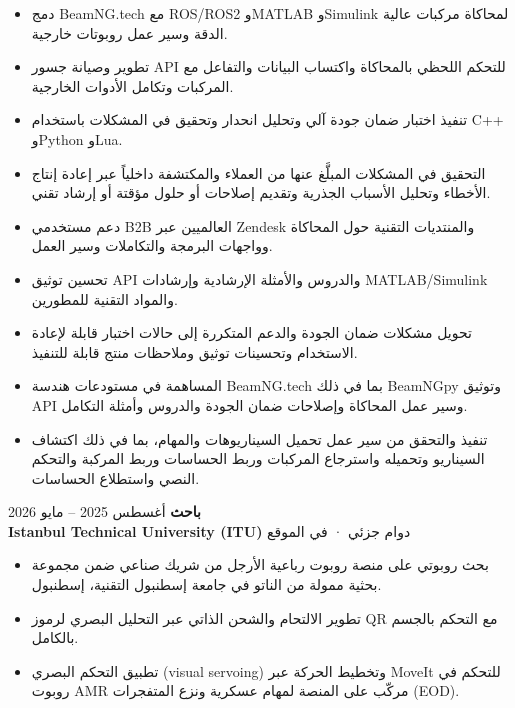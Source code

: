 \documentclass[11pt,a4paper]{article}
\newcommand{\en}[1]{\textenglish{#1}}
\begin{document}
\begin{itemize}
    \item دمج \en{BeamNG.tech} مع \en{ROS/ROS2} و\en{MATLAB} و\en{Simulink} لمحاكاة مركبات عالية الدقة وسير عمل روبوتات خارجية.
    \item تطوير وصيانة جسور \en{API} للتحكم اللحظي بالمحاكاة واكتساب البيانات والتفاعل مع المركبات وتكامل الأدوات الخارجية.
    \item تنفيذ اختبار ضمان جودة آلي وتحليل انحدار وتحقيق في المشكلات باستخدام \en{C++} و\en{Python} و\en{Lua}.
    \item التحقيق في المشكلات المبلَّغ عنها من العملاء والمكتشفة داخلياً عبر إعادة إنتاج الأخطاء وتحليل الأسباب الجذرية وتقديم إصلاحات أو حلول مؤقتة أو إرشاد تقني.
    \item دعم مستخدمي \en{B2B} العالميين عبر \en{Zendesk} والمنتديات التقنية حول المحاكاة وواجهات البرمجة والتكاملات وسير العمل.
    \item تحسين توثيق \en{API} والدروس والأمثلة الإرشادية وإرشادات \en{MATLAB/Simulink} والمواد التقنية للمطورين.
    \item تحويل مشكلات ضمان الجودة والدعم المتكررة إلى حالات اختبار قابلة لإعادة الاستخدام وتحسينات توثيق وملاحظات منتج قابلة للتنفيذ.
    \item المساهمة في مستودعات هندسة \en{BeamNG.tech} بما في ذلك \en{BeamNGpy} وتوثيق \en{API} وسير عمل المحاكاة وإصلاحات ضمان الجودة والدروس وأمثلة التكامل.
    \item تنفيذ والتحقق من سير عمل تحميل السيناريوهات والمهام، بما في ذلك اكتشاف السيناريو وتحميله واسترجاع المركبات وربط الحساسات وربط المركبة والتحكم النصي واستطلاع الحساسات.
\end{itemize}

\textbf{\color{PrimaryColor}باحث} \hfill أغسطس 2025 -- مايو 2026\\
\textbf{\en{Istanbul Technical University (ITU)}} \hfill دوام جزئي · في الموقع

\begin{itemize}
    \item بحث روبوتي على منصة روبوت رباعية الأرجل من شريك صناعي ضمن مجموعة بحثية ممولة من الناتو في جامعة إسطنبول التقنية، إسطنبول.
    \item تطوير الالتحام والشحن الذاتي عبر التحليل البصري لرموز \en{QR} مع التحكم بالجسم بالكامل.
    \item تطبيق التحكم البصري (\en{visual servoing}) وتخطيط الحركة عبر \en{MoveIt} للتحكم في روبوت \en{AMR} مركّب على المنصة لمهام عسكرية ونزع المتفجرات (\en{EOD}).
\end{itemize}
\end{document}
